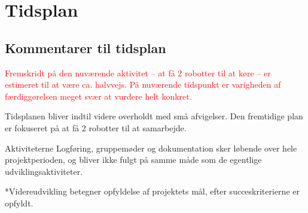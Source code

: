 \section{Tidsplan}

\clearpage
\subsection{Kommentarer til tidsplan}
\textcolor{red}{Fremskridt på den nuværende aktivitet -- at få 2 robotter til at køre -- er estimeret til at være ca. halvvejs. På nuværende tidspunkt er varigheden af færdiggørelsen meget svær at vurdere helt konkret.}

Tidsplanen bliver indtil videre overholdt med små afvigelser. Den fremtidige plan er fokuseret på at få 2 robotter til at samarbejde.

Aktiviteterne Logføring, gruppemøder og dokumentation sker løbende over hele projektperioden, og bliver ikke fulgt på samme måde som de egentlige udviklingsaktiviteter.

*Videreudvikling betegner opfyldelse af projektets mål, efter succeskriterierne er opfyldt.